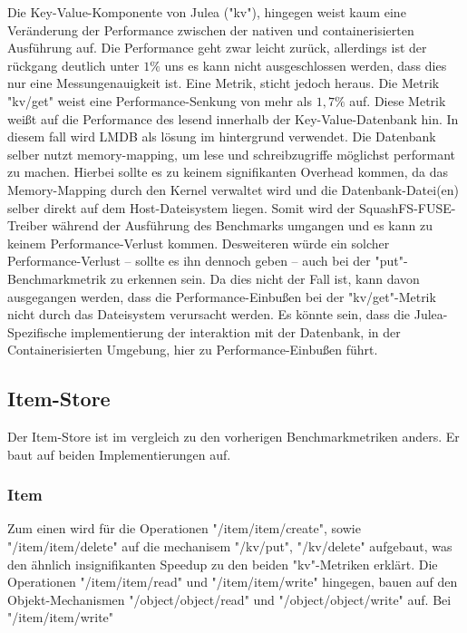 Die Key-Value-Komponente von Julea ("kv"), hingegen weist kaum eine Veränderung der Performance zwischen der nativen und containerisierten Ausführung auf. Die Performance geht zwar leicht zurück, allerdings ist der rückgang deutlich unter $1\%$ uns es kann nicht ausgeschlossen werden, dass dies nur eine Messungenauigkeit ist. Eine Metrik, sticht jedoch heraus. Die Metrik "kv/get" weist eine Performance-Senkung von mehr als $1,7\%$ auf. Diese Metrik weißt auf die Performance des lesend innerhalb der Key-Value-Datenbank hin. In diesem fall wird LMDB als lösung im hintergrund verwendet. Die Datenbank selber nutzt memory-mapping, um lese und schreibzugriffe möglichst performant zu machen. Hierbei sollte es zu keinem signifikanten Overhead kommen, da das Memory-Mapping durch den Kernel verwaltet wird und die Datenbank-Datei(en) selber direkt auf dem Host-Dateisystem liegen. Somit wird der SquashFS-FUSE-Treiber während der Ausführung des Benchmarks umgangen und es kann zu keinem Performance-Verlust kommen. Desweiteren würde ein solcher Performance-Verlust – sollte es ihn dennoch geben – auch bei der "put"-Benchmarkmetrik zu erkennen sein. Da dies nicht der Fall ist, kann davon ausgegangen werden, dass die Performance-Einbußen bei der "kv/get"-Metrik nicht durch das Dateisystem verursacht werden. Es könnte sein, dass die Julea-Spezifische implementierung der interaktion mit der Datenbank, in der Containerisierten Umgebung, hier zu Performance-Einbußen führt. 

\subsection{Item-Store}

Der Item-Store ist im vergleich zu den vorherigen Benchmarkmetriken anders. Er baut auf beiden Implementierungen auf.

\subsubsection{Item}

Zum einen wird für die Operationen "/item/item/create", sowie "/item/item/delete" auf die mechanisem "/kv/put", "/kv/delete" aufgebaut, was den ähnlich insignifikanten Speedup zu den beiden "kv"-Metriken erklärt. 
Die Operationen "/item/item/read" und "/item/item/write" hingegen, bauen auf den Objekt-Mechanismen "/object/object/read" und "/object/object/write" auf. Bei "/item/item/write"

